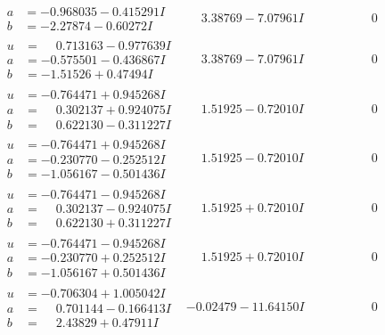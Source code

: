 \documentclass[1p]{elsarticle_modified}
\theoremstyle{definition}
\begin{document}
$$\begin{array}{c|c|c}
\begin{aligned}
a &= -0.968035 - 0.415291 I \\
b &= -2.27874 - 0.60272 I\end{aligned}
 & \phantom{-}3.38769 - 7.07961 I & \phantom{-0.000000 } 0 \\ \hline\begin{aligned}
u &= \phantom{-}0.713163 - 0.977639 I \\
a &= -0.575501 - 0.436867 I \\
b &= -1.51526 + 0.47494 I\end{aligned}
 & \phantom{-}3.38769 - 7.07961 I & \phantom{-0.000000 } 0 \\ \hline\begin{aligned}
u &= -0.764471 + 0.945268 I \\
a &= \phantom{-}0.302137 + 0.924075 I \\
b &= \phantom{-}0.622130 - 0.311227 I\end{aligned}
 & \phantom{-}1.51925 - 0.72010 I & \phantom{-0.000000 } 0 \\ \hline\begin{aligned}
u &= -0.764471 + 0.945268 I \\
a &= -0.230770 - 0.252512 I \\
b &= -1.056167 - 0.501436 I\end{aligned}
 & \phantom{-}1.51925 - 0.72010 I & \phantom{-0.000000 } 0 \\ \hline\begin{aligned}
u &= -0.764471 - 0.945268 I \\
a &= \phantom{-}0.302137 - 0.924075 I \\
b &= \phantom{-}0.622130 + 0.311227 I\end{aligned}
 & \phantom{-}1.51925 + 0.72010 I & \phantom{-0.000000 } 0 \\ \hline\begin{aligned}
u &= -0.764471 - 0.945268 I \\
a &= -0.230770 + 0.252512 I \\
b &= -1.056167 + 0.501436 I\end{aligned}
 & \phantom{-}1.51925 + 0.72010 I & \phantom{-0.000000 } 0 \\ \hline\begin{aligned}
u &= -0.706304 + 1.005042 I \\
a &= \phantom{-}0.701144 - 0.166413 I \\
b &= \phantom{-}2.43829 + 0.47911 I\end{aligned}
 & -0.02479 - 11.64150 I & \phantom{-0.000000 } 0 \\ \hline\begin{aligned}

\end{aligned}
\end{array}$$
\end{document}
